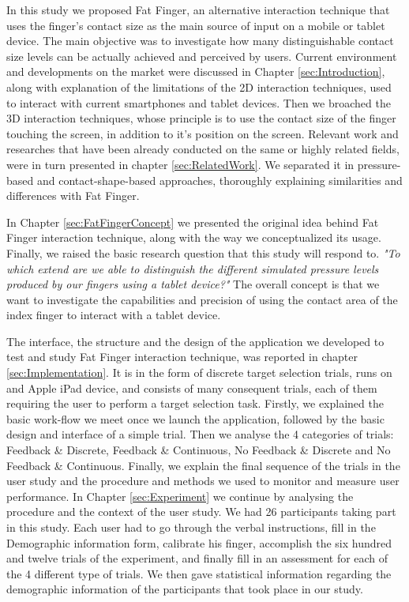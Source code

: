 

In this study we proposed Fat Finger, an alternative interaction technique that uses the finger's contact size as the main source of input on a mobile or tablet device. The main objective was to investigate how many distinguishable contact size levels can be actually achieved and perceived by users. 
Current environment and developments on the market were discussed in Chapter \ref{sec:Introduction}, along with explanation of the limitations of the 2D interaction techniques, used to interact with current smartphones and tablet devices. 
Then we broached the 3D interaction techniques, whose principle is to use the contact size of the finger touching the screen, in addition to it's position on the screen. 
Relevant work and researches that have been already conducted on the same or highly related fields, were in turn presented in chapter \ref{sec:RelatedWork}. We separated it in pressure-based and contact-shape-based approaches, thoroughly explaining similarities and differences with Fat Finger. 

In Chapter \ref{sec:FatFingerConcept} we presented the original idea behind Fat Finger interaction technique, along with the way we conceptualized its usage. Finally, we raised the basic research question that this study will respond to.
 \emph{"To which extend are we able to distinguish the different simulated pressure levels produced by our fingers using a tablet device?"}
The overall concept is that we want to investigate the capabilities and precision of using the contact area of the index finger to interact with a tablet device. 

The interface, the structure and the design of the application we developed to test and study Fat Finger interaction technique, was reported in chapter \ref{sec:Implementation}. It is in the form of discrete target selection trials, runs on and Apple iPad device, and consists of many consequent trials, each of them requiring the user to perform a target selection task.
Firstly, we explained the basic work-flow we meet once we launch the application, followed by the basic design and interface of a simple trial. Then we analyse the 4 categories of trials: Feedback \& Discrete, Feedback \& Continuous, No Feedback \& Discrete and  No Feedback \& Continuous. Finally, we explain the final sequence of the trials in the user study and the procedure and methods we used to monitor and measure user performance.
In Chapter \ref{sec:Experiment} we continue by analysing the procedure and the context of the user study. We had 26 participants taking part in this study.  Each user had to go through the verbal instructions, fill in the Demographic information form, calibrate his finger, accomplish the six hundred and twelve trials of the experiment, and finally fill in an assessment for each of the 4 different type of trials. We then gave statistical information regarding the demographic information of the participants that took place in our study. 


